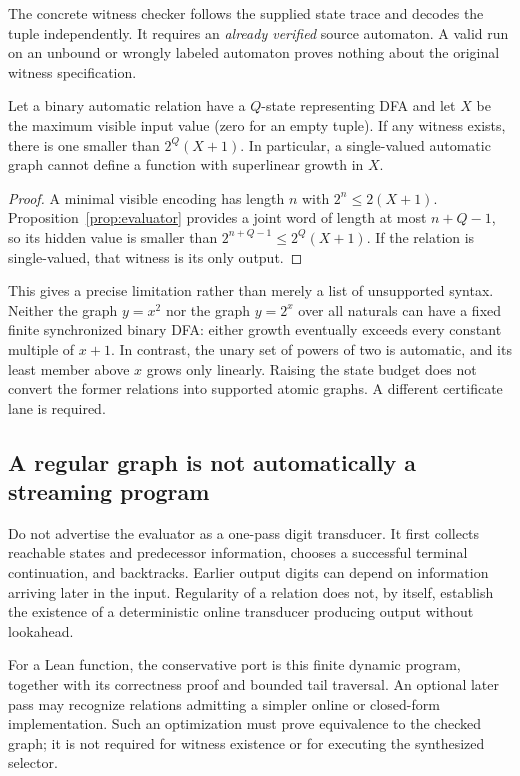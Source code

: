 The concrete witness checker follows the supplied state trace and decodes the tuple independently. It requires an \emph{already verified} source automaton. A valid run on an unbound or wrongly labeled automaton proves nothing about the original witness specification.

\begin{corollary}
Let a binary automatic relation have a \(Q\)-state representing DFA and let \(X\) be the maximum visible input value (zero for an empty tuple). If any witness exists, there is one smaller than \(2^Q(X+1)\). In particular, a single-valued automatic graph cannot define a function with superlinear growth in \(X\).
\end{corollary}
\begin{proof}
A minimal visible encoding has length \(n\) with \(2^n\le2(X+1)\). Proposition~\ref{prop:evaluator} provides a joint word of length at most \(n+Q-1\), so its hidden value is smaller than \(2^{n+Q-1}\le2^Q(X+1)\). If the relation is single-valued, that witness is its only output.
\end{proof}

This gives a precise limitation rather than merely a list of unsupported syntax. Neither the graph \(y=x^2\) nor the graph \(y=2^x\) over all naturals can have a fixed finite synchronized binary DFA: either growth eventually exceeds every constant multiple of \(x+1\). In contrast, the unary set of powers of two is automatic, and its least member above \(x\) grows only linearly. Raising the state budget does not convert the former relations into supported atomic graphs. A different certificate lane is required.

\subsection{A regular graph is not automatically a streaming program}
Do not advertise the evaluator as a one-pass digit transducer. It first collects reachable states and predecessor information, chooses a successful terminal continuation, and backtracks. Earlier output digits can depend on information arriving later in the input. Regularity of a relation does not, by itself, establish the existence of a deterministic online transducer producing output without lookahead.

For a Lean function, the conservative port is this finite dynamic program, together with its correctness proof and bounded tail traversal. An optional later pass may recognize relations admitting a simpler online or closed-form implementation. Such an optimization must prove equivalence to the checked graph; it is not required for witness existence or for executing the synthesized selector.

